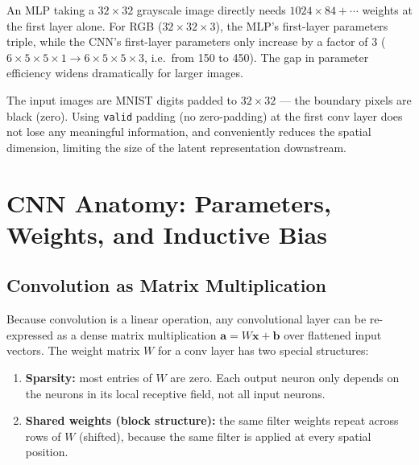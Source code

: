 \documentclass[11pt,a4paper]{article}
\begin{document}
\begin{insightbox}
An MLP taking a $32\times32$ grayscale image directly needs $1024\times84 + \cdots$ weights at the first layer alone. For RGB ($32\times32\times3$), the MLP's first-layer parameters triple, while the CNN's first-layer parameters only increase by a factor of 3 ($6\times5\times5\times1 \to 6\times5\times5\times3$, i.e.\ from 150 to 450). The gap in parameter efficiency widens dramatically for larger images.
\end{insightbox}

\begin{warnbox}
The input images are MNIST digits padded to $32\times32$ — the boundary pixels are black (zero). Using \texttt{valid} padding (no zero-padding) at the first conv layer does not lose any meaningful information, and conveniently reduces the spatial dimension, limiting the size of the latent representation downstream.
\end{warnbox}

\section{CNN Anatomy: Parameters, Weights, and Inductive Bias}
\label{sec:cnn_anatomy}

\subsection{Convolution as Matrix Multiplication}

Because convolution is a linear operation, any convolutional layer can be re-expressed as a dense matrix multiplication $\mathbf{a} = W\mathbf{x} + \mathbf{b}$ over flattened input vectors. The weight matrix $W$ for a conv layer has two special structures:

\begin{enumerate}
  \item \textbf{Sparsity:} most entries of $W$ are zero. Each output neuron only depends on the neurons in its local receptive field, not all input neurons.
  \item \textbf{Shared weights (block structure):} the same filter weights repeat across rows of $W$ (shifted), because the same filter is applied at every spatial position.
\end{enumerate}
\end{document}
